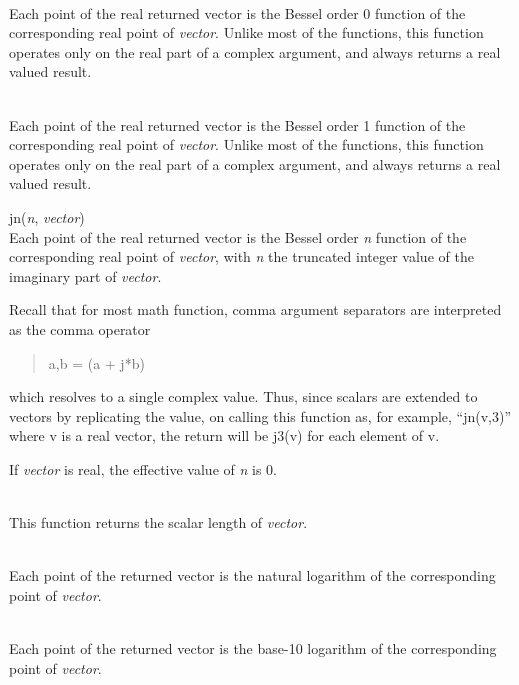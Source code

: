 \begin{description}
\item{}\\
Each point of the real returned vector is the Bessel order 0 function
of the corresponding real point of {\it vector}.  Unlike most of the
functions, this function operates only on the real part of a complex
argument, and always returns a real valued result.

\item{}\\
Each point of the real returned vector is the Bessel order 1 function
of the corresponding real point of {\it vector}.  Unlike most of the
functions, this function operates only on the real part of a complex
argument, and always returns a real valued result.

\item{\vt jn}({\it n\/}, {\it vector\/})\\
Each point of the real returned vector is the Bessel order {\it n}
function of the corresponding real point of {\it vector}, with {\it n}
the truncated integer value of the imaginary part of {\it vector}.

Recall that for most math function, comma argument separators
are interpreted as the comma operator
\begin{quote}
\vt a,b = (a + j*b)
\end{quote}
which resolves to a single complex value.  Thus, since scalars are
extended to vectors by replicating the value, on calling this function
as, for example, ``{\vt jn(v,3)}'' where {\vt v} is a real vector, the
return will be {\vt j3(v)} for each element of {\vt v}.

If {\it vector} is real, the effective value of {\it n} is 0.

\item{}\\
This function returns the scalar length of {\it vector\/}.

\item{}\\
Each point of the returned vector is the natural logarithm of the
corresponding point of {\it vector}.

\item{}\\
Each point of the returned vector is the base-10 logarithm of the
corresponding point of {\it vector}.


\end{description}
